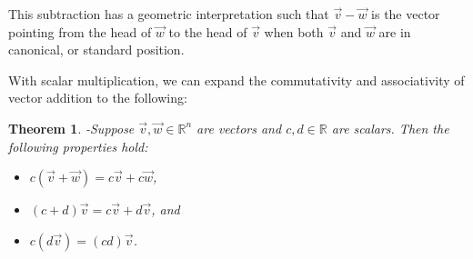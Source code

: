 \documentclass[11pt]{amsart} %
\theoremstyle{plain}
\newtheorem{thrm}{Theorem}
\theoremstyle{definition}
\theoremstyle{definition}
\theoremstyle{remark}
\theoremstyle{definition}
\begin{document}
This subtraction has a geometric interpretation such that $\vec{v}-\vec{w}$ is the vector pointing from the head of $\vec{w}$ to the head of $\vec{v}$ when both $\vec{v}$ and $\vec{w}$ are in canonical, or standard position.

\medskip
With scalar multiplication, we can expand the commutativity and associativity of vector addition to the following:
\begin{tcolorbox}
\begin{thrm}
      -Suppose $\vec{v},\vec{w}\in\mathbb{R}^{n}$ are vectors and $c,d\in\mathbb{R}$ are scalars. Then the following properties hold:
            \begin{itemize}
                  \item[(i)] $c(\vec{v}+\vec{w}) = c\vec{v}+c\vec{w}$,
                  \item[(ii)] $(c+d)\vec{v} = c\vec{v}+d\vec{v}$, and
                  \item[(iii)] $c(d\vec{v}) = (cd)\vec{v}$.
            \end{itemize}
\end{thrm}

\tcblower


\end{tcolorbox}
\end{document}
